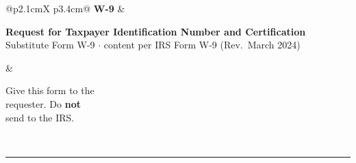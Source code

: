 \documentclass[11pt]{article}
\begin{document}
\pagecolor{acpaper}
\color{acink}

\begin{tabularx}{\linewidth}{@{}p{2.1cm}X p{3.4cm}@{}}
{\acberkeley\LARGE\bfseries W-9} &
{\centering\footnotesize\textbf{Request for Taxpayer Identification Number and Certification}\\[2pt]
Substitute Form W-9 \textcolor{acline}{$\cdot$} content per IRS Form W-9 (Rev.\ March 2024)\par} &
{\raggedleft\footnotesize Give this form to the\\requester. Do \textbf{not}\\send to the IRS.\par} \\
\end{tabularx}

\vspace{0.15em}
\noindent\textcolor{accyan}{\rule{\linewidth}{2pt}}
\vspace{0.4em}
\end{document}
